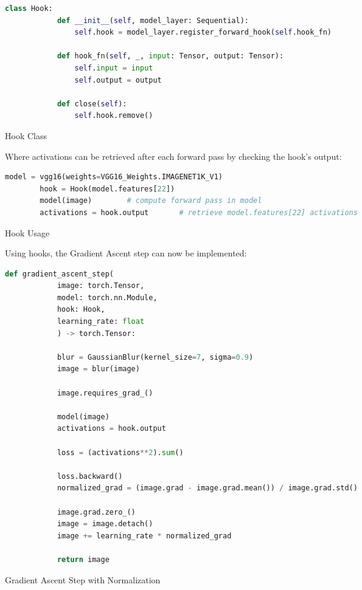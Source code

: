 \begin{program}
    \centering
    \label{code:hook_class}
    \begin{lstlisting}[language=Python, style=wider]
        class Hook:
            def __init__(self, model_layer: Sequential):
                self.hook = model_layer.register_forward_hook(self.hook_fn)

            def hook_fn(self, _, input: Tensor, output: Tensor):
                self.input = input
                self.output = output
            
            def close(self):
                self.hook.remove()
    \end{lstlisting}

    \caption{Hook Class}
\end{program}

\noindent Where activations can be retrieved after each forward pass by checking the hook's output:

\begin{program}
    \centering
    \label{code:hook_usage}

    \begin{lstlisting}[language=Python, style=wider]
        model = vgg16(weights=VGG16_Weights.IMAGENET1K_V1)
        hook = Hook(model.features[22])
        model(image)        # compute forward pass in model
        activations = hook.output       # retrieve model.features[22] activations
    \end{lstlisting}

    \caption{Hook Usage}
\end{program}

\newpage
Using hooks, the Gradient Ascent step can now be implemented:

\begin{program}
    \centering
    \label{code:gradient_ascent_step}

    \begin{lstlisting}[language=Python, style=wider]
        def gradient_ascent_step(
            image: torch.Tensor,
            model: torch.nn.Module,
            hook: Hook,
            learning_rate: float
            ) -> torch.Tensor:
            
            blur = GaussianBlur(kernel_size=7, sigma=0.9)
            image = blur(image)

            image.requires_grad_()
            
            model(image)
            activations = hook.output

            loss = (activations**2).sum()

            loss.backward()
            normalized_grad = (image.grad - image.grad.mean()) / image.grad.std()

            image.grad.zero_()
            image = image.detach()
            image += learning_rate * normalized_grad

            return image
    \end{lstlisting}

    \caption{Gradient Ascent Step with Normalization}
\end{program}

